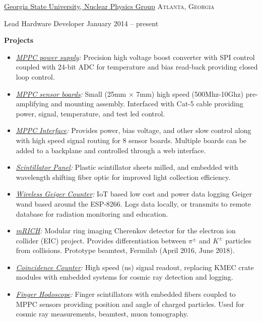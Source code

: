 \headedsection  %
  {\href{http://phynp6.phy-astr.gsu.edu}{Georgia State University, Nuclear Physics Group}}
  {\textsc{Atlanta, Georgia}} {
  \headedsubsection
    {Lead Hardware Developer}
    {January 2014 -- present}
    {
    \textbf{Projects}
    \begin{itemize}
      \renewcommand\labelitemi{--}
      \item \emph{\href{https://github.com/Sawaiz/mppcHighVoltage}{MPPC power supply}:}
        Precision high voltage boost converter with SPI control coupled with 24-bit ADC for temperature and bias read-back providing closed loop control.
      \item \emph{\href{https://github.com/Sawaiz/mppcSensor}{MPPC sensor boards}:}
        Small (25mm $\times$ 7mm) high speed (500Mhz-10Ghz) pre-amplifying and mounting assembly. Interfaced with Cat-5 cable providing power, signal, temperature, and test led control.
      \item \emph{\href{https://github.com/Sawaiz/mppcInterface}{MPPC Interface}:}
        Provides power, bias voltage, and other slow control along with high speed signal routing for 8 sensor boards. Multiple boards can be added to a backplane and controlled through a web interface.
      \item \emph{\href{https://github.com/Sawaiz/scintillatorPanel}{Scintillator Panel}:}
        Plastic scintillator sheets milled, and embedded with wavelength shifting fiber optic for improved light collection efficiency.
      \item \emph{\href{https://github.com/Sawaiz/wirelessGeigerCounter}{Wireless Geiger Counter}:}
        IoT based low cost and power data logging Geiger wand based around the ESP-8266. Logs data locally, or transmits to remote database for radiation monitoring and education.
      \item \emph{\href{https://github.com/Sawaiz/modularRICH}{mRICH}:}
        Modular ring imaging Cherenkov detector for the electron ion collider (EIC) project. Provides differentiation between $\pi^\pm$ and $K^\pm$ particles from collisions. Prototype beamtest, Fermilab (April 2016, June 2018).
      \item \emph{\href{https://github.com/Sawaiz/coincidenceCounter}{Coincidence Counter}:}
        High speed (ns) signal readout, replacing KMEC crate modules with embedded systems for cosmic ray detection and logging.
      \item \emph{\href{https://github.com/Sawaiz/modularHodoscope}{Finger Hodoscope}:}
        Finger scintillators with embedded fibers coupled to MPPC sensors providing position and angle of charged particles. Used for cosmic ray measurements, beamtest, muon tomography.
    \end{itemize}
    }
}